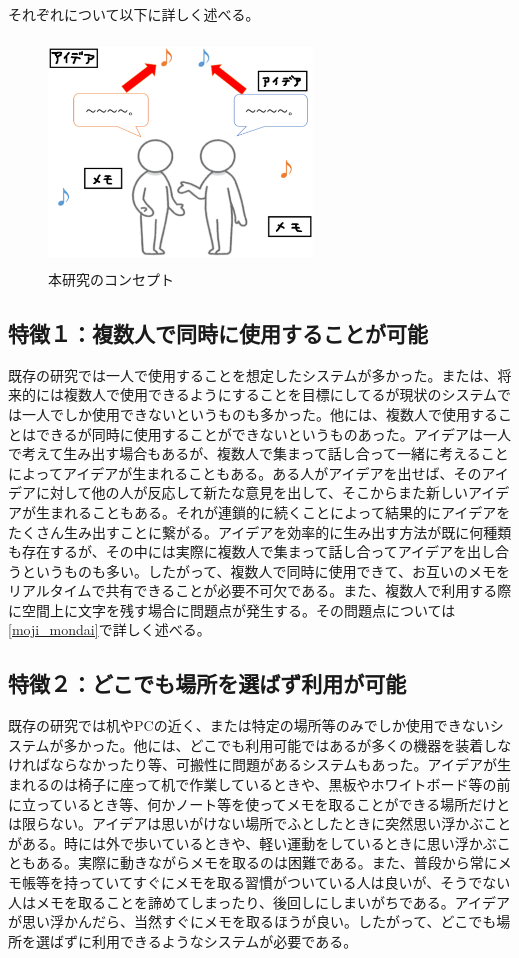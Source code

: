 \documentclass[11pt,a4j, titlepage]{jarticle} %
\begin{document}
それぞれについて以下に詳しく述べる。

\begin{figure}[H]
  \begin{center}
    \includegraphics[clip,height=6.0cm,width=7.0cm]{./concept.eps}
    \caption{本研究のコンセプト}
    \label{fig:concept}
  \end{center}
\end{figure}

\subsection*{特徴１：複数人で同時に使用することが可能}
既存の研究では一人で使用することを想定したシステムが多かった。または、将来的には複数人で使用できるようにすることを目標にしてるが現状のシステムでは一人でしか使用できないというものも多かった。他には、複数人で使用することはできるが同時に使用することができないというものあった。アイデアは一人で考えて生み出す場合もあるが、複数人で集まって話し合って一緒に考えることによってアイデアが生まれることもある。ある人がアイデアを出せば、そのアイデアに対して他の人が反応して新たな意見を出して、そこからまた新しいアイデアが生まれることもある。それが連鎖的に続くことによって結果的にアイデアをたくさん生み出すことに繋がる。アイデアを効率的に生み出す方法が既に何種類も存在するが、その中には実際に複数人で集まって話し合ってアイデアを出し合うというものも多い。したがって、複数人で同時に使用できて、お互いのメモをリアルタイムで共有できることが必要不可欠である。また、複数人で利用する際に空間上に文字を残す場合に問題点が発生する。その問題点については\ref{moji_mondai}で詳しく述べる。

\subsection*{特徴２：どこでも場所を選ばず利用が可能}
既存の研究では机やPCの近く、または特定の場所等のみでしか使用できないシステムが多かった。他には、どこでも利用可能ではあるが多くの機器を装着しなければならなかったり等、可搬性に問題があるシステムもあった。アイデアが生まれるのは椅子に座って机で作業しているときや、黒板やホワイトボード等の前に立っているとき等、何かノート等を使ってメモを取ることができる場所だけとは限らない。アイデアは思いがけない場所でふとしたときに突然思い浮かぶことがある。時には外で歩いているときや、軽い運動をしているときに思い浮かぶこともある。実際に動きながらメモを取るのは困難である。また、普段から常にメモ帳等を持っていてすぐにメモを取る習慣がついている人は良いが、そうでない人はメモを取ることを諦めてしまったり、後回しにしまいがちである。アイデアが思い浮かんだら、当然すぐにメモを取るほうが良い。したがって、どこでも場所を選ばずに利用できるようなシステムが必要である。
\end{document}
